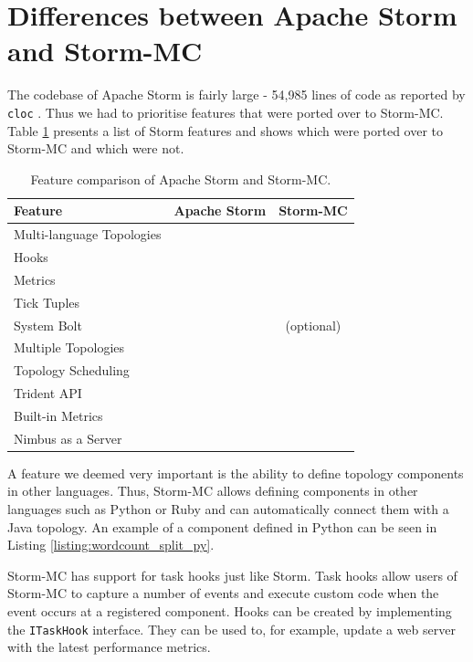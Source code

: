 \documentclass[bsc,deptreport,twoside,singlespacing,normalheadings,parskip]{infthesis}\usepackage[]{graphicx}\usepackage[]{color}
\newcommand{\cmark}{\ding{51}}\newcommand{\xmark}{\ding{55}}
\begin{document}
\section{Differences between Apache Storm and Storm-MC}
\label{sec:differences}

The codebase of Apache Storm is fairly large - 54,985 lines of code as reported by \texttt{cloc} \citep{Cloc}. Thus we had to prioritise features that were ported over to Storm-MC. Table \ref{table:features} presents a list of Storm features and shows which were ported over to Storm-MC and which were not.

\begin{table}[htb!]
\centering
\small
\begin{tabular}{@{}lcc@{}}
    \textbf{Feature} & \textbf{Apache Storm} & \textbf{Storm-MC} \\ \toprule
    Multi-language Topologies & \cmark & \cmark \\
    Hooks & \cmark & \cmark \\
    Metrics & \cmark & \cmark \\
    Tick Tuples & \cmark & \cmark \\
    System Bolt & \cmark & \cmark (optional) \\
    Multiple Topologies & \cmark & \xmark \\
    Topology Scheduling & \cmark & \xmark \\
	Trident API & \cmark & \xmark \\
    Built-in Metrics & \cmark & \xmark \\
    Nimbus as a Server & \cmark & \xmark \\
\end{tabular}
\caption{Feature comparison of Apache Storm and Storm-MC.}
\label{table:features}
\end{table}

A feature we deemed very important is the ability to define topology components in other languages. Thus, Storm-MC allows defining components in other languages such as Python or Ruby and can automatically connect them with a Java topology. An example of a component defined in Python can be seen in Listing \ref{listing:wordcount_split_py}.

Storm-MC has support for task hooks just like Storm. Task hooks allow users of Storm-MC to capture a number of events and execute custom code when the event occurs at a registered component. Hooks can be created by implementing the \texttt{ITaskHook} interface. They can be used to, for example, update a web server with the latest performance metrics.
\end{document}
